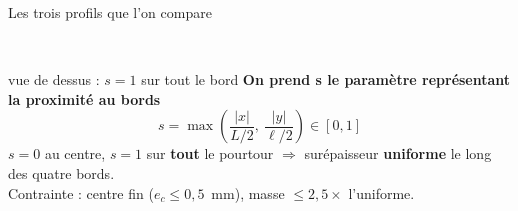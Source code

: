 \documentclass[11pt,aspectratio=169]{beamer}
\begin{document}
\begin{frame}{Les trois profils que l'on compare}
\begin{columns}[c]
\\[2pt]
      {\tiny vue de dessus : $s=1$ sur tout le bord}
      \footnotesize
      \textbf{On prend s le paramètre représentant la proximité au bords}
      \[ s=\max\!\left(\frac{|x|}{L/2},\ \frac{|y|}{\ell/2}\right)\in[0,1] \]
      $s=0$ au centre, $s=1$ sur \textbf{tout} le pourtour $\Rightarrow$
      surépaisseur \textbf{uniforme} le long des quatre bords.\\[2pt]
      {\scriptsize Contrainte : centre fin ($e_c\le 0{,}5$~mm),
      masse $\le 2{,}5\times$ l'uniforme.}
  \end{columns}
\end{frame}

\end{document}
